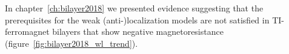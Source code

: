 In chapter~\ref{ch:bilayer2018} we presented evidence suggesting that the prerequisites for the weak (anti-)localization models are not satisfied in TI-ferromagnet bilayers that show negative magnetoresistance (figure~\ref{fig:bilayer2018_wl_trend}).